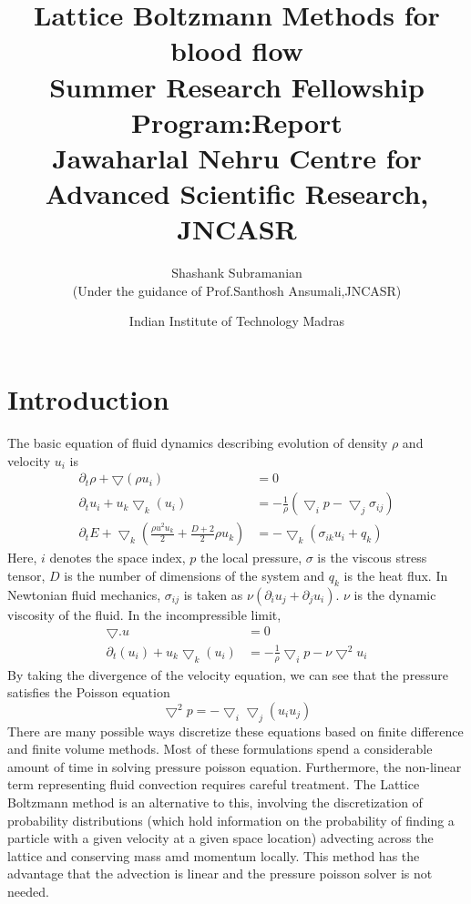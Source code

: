 \documentclass[titlepage,a4paper,10pt]{article}
\title{\textbf{Lattice Boltzmann Methods for blood flow}\\ Summer Research Fellowship Program:Report\\Jawaharlal Nehru Centre for Advanced Scientific Research, JNCASR}
\author{Shashank Subramanian\\ (Under the guidance of Prof.Santhosh Ansumali,JNCASR)}
\date{Indian Institute of Technology Madras}
\begin{document}
\maketitle
\section{Introduction}
The basic equation of fluid dynamics describing evolution of density $\rho$ and velocity $u_i$ is
\begin{equation} 
\begin{aligned}
\partial_t \rho + \bigtriangledown(\rho u_i) &= 0 \\
\partial_tu_i + u_k\bigtriangledown_k(u_i) &= -\frac{1}{\rho}(\bigtriangledown_ip - \bigtriangledown_j\sigma_{ij}) \\
\partial_tE + \bigtriangledown_k(\frac{\rho u^2u_k}{2} + \frac{D+2}{2}\rho u_k) &= -\bigtriangledown_k(\sigma_{ik}u_i + q_k) 
\end{aligned}
\end{equation}
Here, $i$ denotes the space index, $p$ the local pressure, $\sigma$ is the viscous stress tensor, $D$ is the number of dimensions of the system and $q_k$ is the heat flux.
In Newtonian fluid mechanics, $\sigma_{ij}$ is taken as $\nu(\partial_iu_j + \partial_ju_i)$. $\nu$ is the dynamic viscosity of the fluid.
In the incompressible limit,
\begin{equation} 
\begin{aligned}
\bigtriangledown.u &= 0 \\
\partial_t(u_i) + u_k\bigtriangledown_k(u_i) &= -\frac{1}{\rho}\bigtriangledown_ip - \nu\bigtriangledown^2u_i
\end{aligned}
\end{equation}
By taking the divergence of the velocity equation, we can see that the pressure satisfies the Poisson equation
\begin{equation}
\bigtriangledown^2p = -\bigtriangledown_i\bigtriangledown_j(u_iu_j) 
\end{equation}
There are many possible ways discretize these equations based on finite difference and finite volume methods. Most of these formulations spend a considerable amount of time in solving pressure poisson equation. Furthermore, the non-linear term representing fluid convection requires careful treatment.
The Lattice Boltzmann method is an alternative to this, involving the discretization of probability distributions (which hold
information on the probability of finding a particle with a given velocity at a given space location) advecting across 
the lattice and conserving mass amd momentum locally. This method has the advantage that the advection is linear and the pressure poisson solver is not needed.
\end{document}
